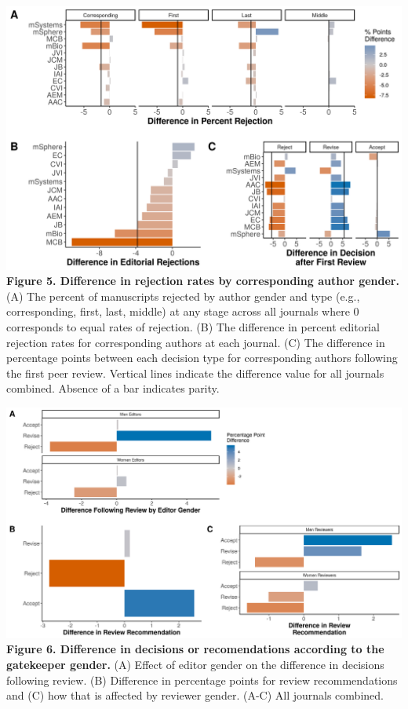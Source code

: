 \documentclass[11pt,]{article}
\begin{document}
\includegraphics{Figure_4.png} \textbf{Figure 5. Difference in rejection
rates by corresponding author gender.} (A) The percent of manuscripts
rejected by author gender and type (e.g., corresponding, first, last,
middle) at any stage across all journals where 0 corresponds to equal
rates of rejection. (B) The difference in percent editorial rejection
rates for corresponding authors at each journal. (C) The difference in
percentage points between each decision type for corresponding authors
following the first peer review. Vertical lines indicate the difference
value for all journals combined. Absence of a bar indicates parity.

\newpage

\includegraphics{Figure_5.png} \textbf{Figure 6. Difference in decisions
or recomendations according to the gatekeeper gender.} (A) Effect of
editor gender on the difference in decisions following review. (B)
Difference in percentage points for review recommendations and (C) how
that is affected by reviewer gender. (A-C) All journals combined.
\end{document}
